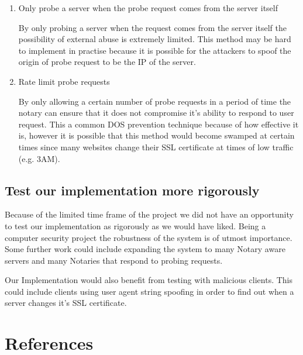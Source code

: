 \documentclass[preprint,review,12pt]{elsarticle}
\begin{document}
\begin{enumerate}
    \item {Only probe a server when the probe request comes from the server itself}

        By only probing a server when the request comes from the server itself
        the possibility of external abuse is extremely limited. This method may
        be hard to implement in practise because it is possible for the
        attackers to spoof the origin of probe request to be the IP of the
        server.

    \item {Rate limit probe requests}

        By only allowing a certain number of probe requests in a period of time
        the notary can ensure that it does not compromise it's ability to
        respond to user request. This a common DOS prevention technique because
        of how effective it is, however it is possible that this method would
        become swamped at certain times since many websites change their SSL
        certificate at times of low traffic (e.g. 3AM).
\end{enumerate}

\subsection{Test our implementation more rigorously}

Because of the limited time frame of the project we did not have an opportunity
to test our implementation as rigorously as we would have liked. Being a
computer security project the robustness of the system is of utmost importance.
Some further work could include expanding the system to many Notary aware
servers and many Notaries that respond to probing requests.

Our Implementation would also benefit from testing with malicious clients. This
could include clients using user agent string spoofing in order to find out
when a server changes it's SSL certificate.

\section{References}
\label{references}
\nocite{*}


\end{document}
